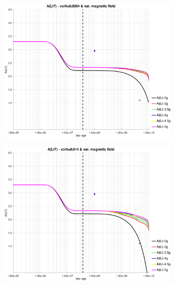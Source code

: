 \documentclass[fleqn,usenatbib]{mnras}
\begin{document}
\begin{figure}
    \centering
    \begin{subfigure}[h]{0.47\textwidth}
    \includegraphics[trim = 35mm 15mm 15mm 15mm, clip,width=\textwidth]{figures/li_vc_0084_var_g.eps}
    \label{fig:subim21}
    \end{subfigure}
    \begin{subfigure}[h]{0.47\textwidth}
    \includegraphics[trim = 35mm 15mm 15mm 15mm, clip,width=\textwidth]{figures/li_vc_014_var_g.eps}
    \label{fig:subim22}
    \end{subfigure}
    \begin{subfigure}[h]{0.47\textwidth}

\end{subfigure}
\end{figure}
\end{document}
